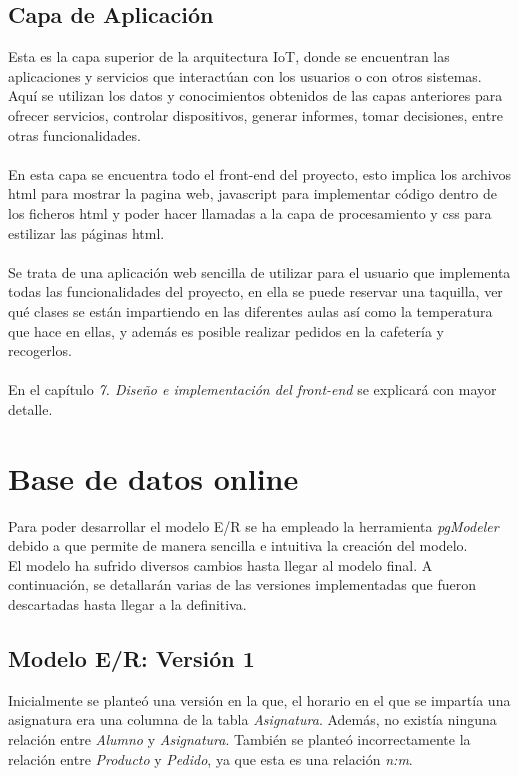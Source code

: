 \documentclass[12pt]{report}
\begin{document}
\section{Capa de Aplicación}
Esta es la capa superior de la arquitectura IoT, donde se encuentran las aplicaciones y servicios que interactúan con los usuarios o con otros sistemas. Aquí se utilizan los datos y conocimientos obtenidos de las capas anteriores para ofrecer servicios, controlar dispositivos, generar informes, tomar decisiones, entre otras funcionalidades.
\\\\
En esta capa se encuentra todo el front-end del proyecto, esto implica los archivos html para mostrar la pagina web, javascript para implementar código dentro de los ficheros html y poder hacer llamadas a la capa de procesamiento y css para estilizar las páginas html. 
\\\\
Se trata de una aplicación web sencilla de utilizar para el usuario que implementa todas las funcionalidades del proyecto, en ella se puede reservar una taquilla, ver qué clases se están impartiendo en las diferentes aulas así como la temperatura que hace en ellas, y además es posible realizar pedidos en la cafetería y recogerlos.
\\\\
En el capítulo \textit{7. Diseño e implementación del front-end} se explicará con mayor detalle.

\chapter{Base de datos online} 
Para poder desarrollar el modelo E/R se ha empleado la herramienta \textit{pgModeler} debido a que permite de manera sencilla e intuitiva la creación del modelo.
\\
El modelo ha sufrido diversos cambios hasta llegar al modelo final. A continuación, se detallarán varias de las versiones implementadas que fueron descartadas hasta llegar a la definitiva.

\section{Modelo E/R: Versión 1}
Inicialmente se planteó una versión en la que, el horario en el que se impartía una asignatura era una columna de la tabla \textit{Asignatura}. Además, no existía ninguna relación entre \textit{Alumno} y \textit{Asignatura}. También se planteó incorrectamente la relación entre \textit{Producto} y \textit{Pedido}, ya que esta es una relación \textit{n:m}.
\end{document}
